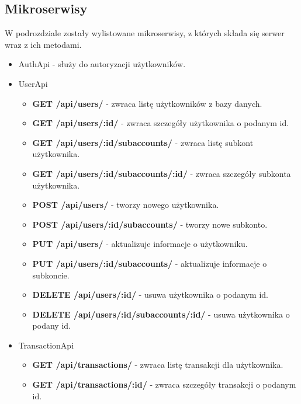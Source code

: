 \documentclass{article}
\begin{document}
	\subsection{Mikroserwisy}
	W podrozdziale zostały wylistowane mikroserwisy, z których składa się serwer wraz z ich 
	metodami.
	\begin{itemize}
		\item AuthApi - służy do autoryzacji użytkowników.
		\item UserApi
			\begin{itemize}
				\item \textbf{GET /api/users/} - zwraca listę użytkowników z bazy danych.
				
				\item \textbf{GET /api/users/:id/} - zwraca szczegóły użytkownika o podanym id.
				
				\item \textbf{GET /api/users/:id/subaccounts/} - zwraca listę subkont użytkownika.
				
				\item \textbf{GET /api/users/:id/subaccounts/:id/} - zwraca szczegóły subkonta użytkownika.
				
				\item \textbf{POST /api/users/} - tworzy nowego użytkownika.
				
				\item \textbf{POST /api/users/:id/subaccounts/} - tworzy nowe subkonto.
				
				\item \textbf{PUT /api/users/} - aktualizuje informacje o użytkowniku.
				
				\item \textbf{PUT /api/users/:id/{subaccounts}/} - aktualizuje informacje o subkoncie.
				
				\item \textbf{DELETE /api/users/:id/} - usuwa użytkownika o podanym id.
				
				\item \textbf{DELETE /api/users/:id/subaccounts/:id/} - usuwa użytkownika o podany id.
			\end{itemize}
		\item TransactionApi
			\begin{itemize}
				\item \textbf{GET /api/transactions/} - zwraca listę transakcji dla użytkownika.
				
				\item \textbf{GET /api/transactions/:id/} - zwraca szczegóły transakcji o podanym id.
				

\end{itemize}
\end{itemize}
\end{document}
